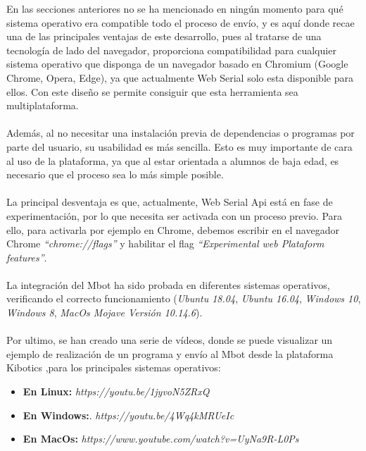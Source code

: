 \documentclass{report}
\begin{document}
En las secciones anteriores no se ha mencionado en ningún momento para qué sistema operativo era compatible todo el proceso de envío, y es aquí donde recae una de las principales ventajas de este desarrollo, pues al tratarse de una tecnología de lado del navegador, proporciona compatibilidad para cualquier sistema operativo que disponga de un navegador basado en Chromium (Google Chrome, Opera, Edge), ya que actualmente Web Serial solo esta disponible para ellos. Con este diseño se permite consiguir que esta herramienta sea multiplataforma.
\\
\\
Además, al no necesitar una instalación previa de dependencias o programas por parte del usuario, su usabilidad es más sencilla. Esto es muy importante de cara al uso de la plataforma, ya que al estar orientada a alumnos de baja edad, es necesario que el proceso sea lo más simple posible.
\\
\\
La principal desventaja es que, actualmente, Web Serial Api está en fase de experimentación, por lo que necesita ser activada con un proceso previo. Para ello, para activarla por ejemplo en Chrome, debemos escribir en el navegador Chrome \textit{“chrome://flags”} y habilitar el flag \textit{“Experimental web Plataform features”}.
\\ 
\\
La integración del Mbot ha sido probada en diferentes sistemas operativos, verificando el correcto funcionamiento (\textit{Ubuntu 18.04}, \textit{Ubuntu 16.04}, \textit{Windows 10},  \textit{Windows 8},  \textit{MacOs Mojave Versión 10.14.6}).
\\
\\
Por ultimo, se han creado una serie de vídeos, donde se puede visualizar un ejemplo de realización de un programa y envío al Mbot desde la plataforma Kibotics ,para los principales sistemas operativos:
\begin{itemize}
	\item \textbf{En Linux:} \textit{https://youtu.be/1jyvoN5ZRxQ}
	\item \textbf{En Windows:}. \textit{https://youtu.be/4Wq4kMRUeIc}
	\item \textbf{En MacOs:} \textit{https://www.youtube.com/watch?v=UyNa9R-L0Ps}
\end{itemize}
\end{document}

